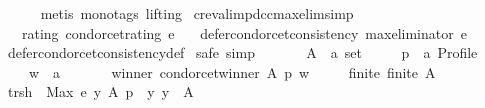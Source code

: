 \begin{isabellebody}
\ \ \ \ \isamarkupfalse%
\ {\isacharparenleft}{\kern0pt}metis\ {\isacharparenleft}{\kern0pt}mono{\isacharunderscore}{\kern0pt}tags{\isacharcomma}{\kern0pt}\ lifting{\isacharparenright}{\kern0pt}{\isacharparenright}{\kern0pt}\isanewline
{}\isamarkupfalse%
%
\endisatagproof
{\isafoldproof}%
%
\isadelimproof
\isanewline
%
\endisadelimproof
\isanewline
\isanewline
{}\isamarkupfalse%
\ cr{\isacharunderscore}{\kern0pt}eval{\isacharunderscore}{\kern0pt}imp{\isacharunderscore}{\kern0pt}dcc{\isacharunderscore}{\kern0pt}max{\isacharunderscore}{\kern0pt}elim{\isacharbrackleft}{\kern0pt}simp{\isacharbrackright}{\kern0pt}{\isacharcolon}{\kern0pt}\isanewline
\ \ \ rating{\isacharcolon}{\kern0pt}\ {\isachardoublequoteopen}condorcet{\isacharunderscore}{\kern0pt}rating\ e{\isachardoublequoteclose}\isanewline
\ \ \ {\isachardoublequoteopen}defer{\isacharunderscore}{\kern0pt}condorcet{\isacharunderscore}{\kern0pt}consistency\ {\isacharparenleft}{\kern0pt}max{\isacharunderscore}{\kern0pt}eliminator\ e{\isacharparenright}{\kern0pt}{\isachardoublequoteclose}\isanewline
%
\isadelimproof
\ \ %
\endisadelimproof
%
\isatagproof
{}\isamarkupfalse%
\ defer{\isacharunderscore}{\kern0pt}condorcet{\isacharunderscore}{\kern0pt}consistency{\isacharunderscore}{\kern0pt}def\isanewline
{}\isamarkupfalse%
\ {\isacharparenleft}{\kern0pt}safe{\isacharcomma}{\kern0pt}\ simp{\isacharparenright}{\kern0pt}\isanewline
\ \ \isamarkupfalse%
\isanewline
\ \ \ \ A\ {\isacharcolon}{\kern0pt}{\isacharcolon}{\kern0pt}\ {\isachardoublequoteopen}{\isacharprime}{\kern0pt}a\ set{\isachardoublequoteclose}\ \isanewline
\ \ \ \ p\ {\isacharcolon}{\kern0pt}{\isacharcolon}{\kern0pt}\ {\isachardoublequoteopen}{\isacharprime}{\kern0pt}a\ Profile{\isachardoublequoteclose}\ \isanewline
\ \ \ \ w\ {\isacharcolon}{\kern0pt}{\isacharcolon}{\kern0pt}\ {\isachardoublequoteopen}{\isacharprime}{\kern0pt}a{\isachardoublequoteclose}\isanewline
\ \ \isamarkupfalse%
\isanewline
\ \ \ \ winner{\isacharcolon}{\kern0pt}\ {\isachardoublequoteopen}condorcet{\isacharunderscore}{\kern0pt}winner\ A\ p\ w{\isachardoublequoteclose}\ \isanewline
\ \ \ \ finite{\isacharcolon}{\kern0pt}\ {\isachardoublequoteopen}finite\ A{\isachardoublequoteclose}\isanewline
\ \ \isamarkupfalse%
\ {\isacharquery}{\kern0pt}trsh\ {\isacharequal}{\kern0pt}\ {\isachardoublequoteopen}{\isacharparenleft}{\kern0pt}Max\ {\isacharbraceleft}{\kern0pt}e\ y\ A\ p\ {\isacharbar}{\kern0pt}\ y{\isachardot}{\kern0pt}\ y\ {\isasymin}\ A{\isacharbraceright}{\kern0pt}{\isacharparenright}{\kern0pt}{\isachardoublequoteclose}\isanewline

\end{isabellebody}
